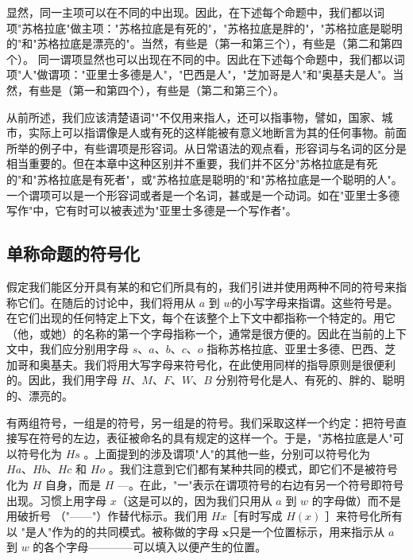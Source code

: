 显然，同一主项可以在不同的中出现。因此，在下述每个命题中，我们都以词项"苏格拉底"做主项："苏格拉底是有死的"，"苏格拉底是胖的"，"苏格拉底是聪明的"和"苏格拉底是漂亮的"。当然，有些是（第一和第三个），有些是（第二和第四个）。\cite{quine1953} 同一谓项显然也可以出现在不同的中。因此在下述每个命题中，我们都以词项"人"做谓项："亚里士多德是人"，"巴西是人"，"芝加哥是人"和"奥基夫是人"。当然，有些是（第一和第四个），有些是（第二和第三个）。

从前所述，我们应该清楚语词""不仅用来指人，还可以指事物，譬如，国家、城市，实际上可以指谓像是人或有死的这样能被有意义地断言为其的任何事物。前面所举的例子中，有些谓项是形容词。从日常语法的观点看，形容词与名词的区分是相当重要的。但在本章中这种区别并不重要，我们并不区分"苏格拉底是有死的"和"苏格拉底是有死者"，或"苏格拉底是聪明的"和"苏格拉底是一个聪明的人"。一个谓项可以是一个形容词或者是一个名词，甚或是一个动词。如在"亚里士多德写作"中，它有时可以被表述为"亚里士多德是一个写作者"。

\subsection{单称命题的符号化}

\begin{theorembox}[title=符号化系统]
假定我们能区分开具有某的和它们所具有的，我们引进并使用两种不同的符号来指称它们。在随后的讨论中，我们将用从 $a$ 到 $w$的小写字母来指谓。这些符号是。在它们出现的任何特定上下文，每个在该整个上下文中都指称一个特定的。用它（他，或她）的名称的第一个字母指称一个，通常是很方便的。因此在当前的上下文中，我们应分别用字母 $s 、 a 、 b 、 c 、 o$ 指称苏格拉底、亚里士多德、巴西、芝加哥和奥基夫。我们将用大写字母来符号化，在此使用同样的指导原则是很便利的。因此，我们用字母 $H 、 M 、 F 、 W 、 B$ 分别符号化是人、有死的、胖的、聪明的、漂亮的。
\end{theorembox}

有两组符号，一组是的符号，另一组是的符号。我们采取这样一个约定：把符号直接写在符号的左边，表征被命名的具有规定的这样一个。于是，"苏格拉底是人"可以符号化为 $H s$ 。上面提到的涉及谓项"人"的其他一些，分别可以符号化为 $H a 、 H b 、 H c$ 和 $H o$ 。我们注意到它们都有某种共同的模式，即它们不是被符号化为 $H$ 自身，而是 $H$ —。在此，"一"表示在谓项符号的右边有另一个符号即符号出现。习惯上用字母 $x$（这是可以的，因为我们只用从 $a$ 到 $w$ 的字母做）而不是用破折号 （"——"）作替代标示。我们用 $H x$［有时写成 $H(x)$ ］来符号化所有以 "是人"作为的的共同模式。被称做的字母 $\boldsymbol{x}$只是一个位置标示，用来指示从 $a$ 到 $w$ 的各个字母————可以填入以便产生的位置。

